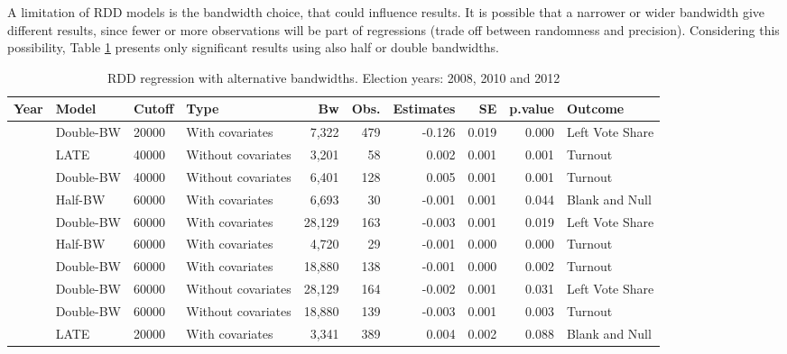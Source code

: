 \documentclass[
  12pt,
]{article}
\begin{document}
A limitation of RDD models is the bandwidth choice, that could influence
results. It is possible that a narrower or wider bandwidth give
different results, since fewer or more observations will be part of
regressions (trade off between randomness and precision). Considering
this possibility, Table \ref{tab:r.sig} presents only significant
results using also half or double bandwidths.

\begin{landscape}\begin{table}[!h]

\caption{\label{tab:r.sig}RDD regression with alternative bandwidths. Election years: 2008, 2010 and 2012}
\centering
\fontsize{9}{11}\selectfont
\begin{tabular}[t]{llllrrrrrl}
\toprule
Year & Model & Cutoff & Type & Bw & Obs. & Estimates & SE & p.value & Outcome\\
\midrule
 & Double-BW & 20000 & With covariates & 7,322 & 479 & -0.126 & 0.019 & 0.000 & Left Vote Share\\

 & LATE & 40000 & Without covariates & 3,201 & 58 & 0.002 & 0.001 & 0.001 & Turnout\\

 & Double-BW & 40000 & Without covariates & 6,401 & 128 & 0.005 & 0.001 & 0.001 & Turnout\\

 & Half-BW & 60000 & With covariates & 6,693 & 30 & -0.001 & 0.001 & 0.044 & Blank and Null\\

 & Double-BW & 60000 & With covariates & 28,129 & 163 & -0.003 & 0.001 & 0.019 & Left Vote Share\\

 & Half-BW & 60000 & With covariates & 4,720 & 29 & -0.001 & 0.000 & 0.000 & Turnout\\

 & Double-BW & 60000 & With covariates & 18,880 & 138 & -0.001 & 0.000 & 0.002 & Turnout\\

 & Double-BW & 60000 & Without covariates & 28,129 & 164 & -0.002 & 0.001 & 0.031 & Left Vote Share\\

\multirow{-9}{*}{\raggedright\arraybackslash 2008} & Double-BW & 60000 & Without covariates & 18,880 & 139 & -0.003 & 0.001 & 0.003 & Turnout\\
\cmidrule{1-10}
 & LATE & 20000 & With covariates & 3,341 & 389 & 0.004 & 0.002 & 0.088 & Blank and Null\\


\end{tabular}
\end{table}
\end{landscape}
\end{document}

